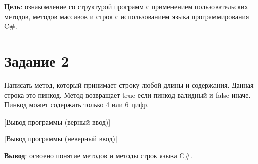 \documentclass{bsuir}
\newcommand{\csharp}{C{\liberationrm\#}}
\begin{document}
\maketitle

\textbf{Цель}: ознакомление со структурой программ с применением
пользовательских методов, методов массивов и строк с использованием языка
программирования \csharp.

\section*{Задание 2}

Написать метод, который принимает строку любой длины и содержания. Данная строка
это пинкод. Метод возвращает true если пинкод валидный и false иначе. Пинкод
может содержать только 4 или 6 цифр.


[Вывод программы (верный ввод)]

[Вывод программы (неверный ввод)]

\textbf{Вывод}: освоено понятие методов и методы строк языка \csharp.
\end{document}
